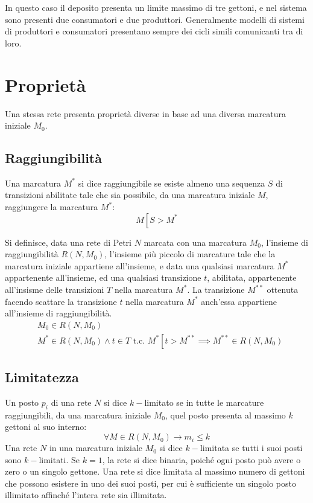 \documentclass{article}
\numberwithin{equation}{subsection}
\begin{document}
In questo caso il deposito presenta un limite massimo di tre gettoni, e nel sistema sono presenti due consumatori e due produttori. Generalmente modelli di sistemi di produttori 
e consumatori presentano sempre dei cicli simili comunicanti tra di loro. 

\clearpage

\section{Proprietà}

Una stessa rete presenta proprietà diverse in base ad una diversa marcatura iniziale $M_0$. 

\subsection{Raggiungibilità}
Una marcatura $M^*$ si dice raggiungibile se esiste almeno una sequenza $S$ di transizioni abilitate tale che sia possibile, da una marcatura iniziale $M$, raggiungere la 
marcatura $M^*$:
\begin{equation*}
    M\left[S>M^*\right.
\end{equation*}


Si definisce, data una rete di Petri $N$ marcata con una marcatura $M_0$, l'insieme di raggiungibilità $R(N,M_0)$, l'insieme più piccolo di marcature tale che la marcatura 
iniziale appartiene all'insieme, e data una qualsiasi marcatura $M^*$ appartenente all'insieme, ed una qualsiasi transizione $t$, abilitata, appartenente all'insisme delle transizioni 
$T$ nella marcatura $M^*$. La transizione $M^{**}$ ottenuta facendo scattare la transizione $t$ nella marcatura $M^*$ anch'essa appartiene all'insieme di raggiungibilità. 
\begin{align*}
    &M_0\in R(N,M_0)\\
    &M^*\in R(N,M_0)\land t\in T\mbox{ t.c. } M^*\left[\right.t>M^{**}\implies M^{**}\in R(N,M_0)
\end{align*}

\subsection{Limitatezza}

Un posto $p_i$ di una rete $N$ si dice $k-$limitato se in tutte le marcature raggiungibili, da una marcatura iniziale $M_0$, quel posto presenta al massimo $k$ gettoni al 
suo interno:
\begin{equation*}
    \forall M\in R(N,M_0)\to m_i\leq k
\end{equation*} 
Una rete $N$ in una marcatura iniziale $M_0$ si dice $k-$limitata se tutti i suoi posti sono $k-$limitati. Se $k=1$, la rete si dice binaria, poiché ogni 
posto può avere o zero o un singolo gettone. Una rete si dice limitata al massimo numero di gettoni che possono esistere in uno dei suoi posti, per cui è sufficiente un 
singolo posto illimitato affinché l'intera rete sia illimitata. 
\end{document}
